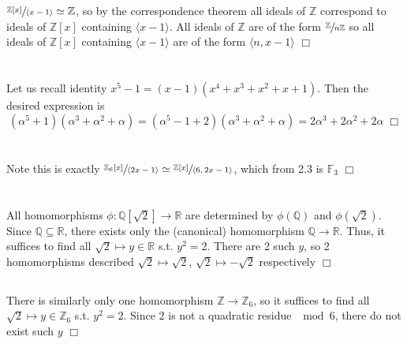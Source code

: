 \documentclass{article}
\begin{document}
\section{}
$\sfrac{\mathbb{Z}[x]}{\langle x-1 \rangle} \simeq \mathbb{Z}$, so by the correspondence theorem all ideals of $\mathbb{Z}$ correspond to ideals of $\mathbb{Z}[x]$ containing $\langle x-1 \rangle$. All ideals of $\mathbb{Z}$ are of the form $\sfrac{\mathbb{Z}}{n \mathbb{Z}}$ so all ideals of $\mathbb{Z}[x]$ containing $\langle x-1 \rangle$ are of the form $\langle n,x-1 \rangle$ $\Box$

\section{}
Let us recall identity $x^5-1 = (x-1)(x^4+x^3+x^2+x+1)$. Then the desired expression is
$$(\alpha^5+1)(\alpha^3 + \alpha^2 + \alpha) = (\alpha^5 - 1 + 2)(\alpha^3+\alpha^2+\alpha) = 2\alpha^3 + 2\alpha^2 + 2\alpha \; \Box$$

\section{}
Note this is exactly $\sfrac{\mathbb{Z}_6[x]}{\langle 2x-1 \rangle} \simeq \sfrac{\mathbb{Z}[x]}{\langle 6,2x-1 \rangle}$, which from 2.3 is $\mathbb{F}_3$ $\Box$

\section{}
\subsection{}
All homomorphisms $\phi: \mathbb{Q}[\sqrt{2}] \to \mathbb{R}$ are determined by $\phi(\mathbb{Q})$ and $\phi(\sqrt{2})$. Since $\mathbb{Q} \subseteq \mathbb{R}$, there exists only the (canonical) homomorphism $\mathbb{Q} \to \mathbb{R}$. Thus, it suffices to find all $\sqrt{2} \mapsto y \in \mathbb{R}$ s.t. $y^2 = 2$. There are 2 such $y$, so 2 homomorphisms described $\sqrt{2} \mapsto \sqrt{2}$, $\sqrt{2} \mapsto -\sqrt{2}$ respectively $\Box$
\subsection{}
There is similarly only one homomorphism $\mathbb{Z} \to \mathbb{Z}_6$, so it suffices to find all $\sqrt{2} \mapsto y \in \mathbb{Z}_6$ s.t. $y^2 = 2$. Since 2 is not a quadratic residue $\mod 6$, there do not exist such $y$ $\Box$
\end{document}
